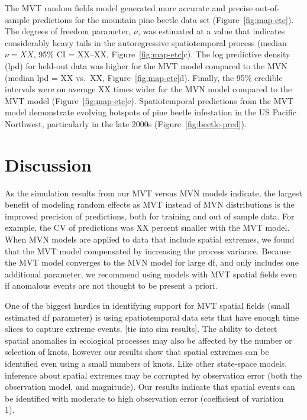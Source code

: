 \documentclass[12pt,english]{article}
\begin{document}
\begin{spacing}{1.3}
The MVT random fields model generated more accurate and precise out-of-sample
predictions for the mountain pine beetle data set (Figure~\ref{fig:map-etc}).
The degrees of freedom parameter, $\nu$, was estimated at a value that
indicates considerably heavy tails in the autoregressive spatiotemporal process
(median $\nu = XX$, 95\% CI = XX--XX, Figure~\ref{fig:map-etc}c). The log
predictive density (lpd) for held-out data was higher for the MVT model
compared to the MVN (median lpd = XX vs.\ XX, Figure~\ref{fig:map-etc}d).
Finally, the 95\% credible intervals were on average XX times wider for the MVN
model compared to the MVT model (Figure~\ref{fig:map-etc}e). Spatiotemporal
predictions from the MVT model demonstrate evolving hotspots of pine beetle
infestation in the US Pacific Northwest, particularly in the late 2000s
(Figure~\ref{fig:beetle-pred}).

\section{Discussion}

As the simulation results from our MVT versus MVN models indicate, the largest
benefit of modeling random effects as MVT instead of MVN distributions is the
improved precision of predictions, both for training and out of sample data.
For example, the CV of predictions was XX percent smaller with the MVT model.
When MVN models are applied to data that include spatial extremes, we found that
the MVT model compensated by increasing the process variance. Because the MVT model
converges to the MVN model for large df, and only includes one additional parameter,
we recommend using models with MVT spatial fields even if anomalous events are not
thought to be present a priori.

One of the biggest hurdles in identifying support for MVT spatial fields (small estimated
df parameter) is using spatiotemporal data sets that have enough time slices to capture
extreme events. [tie into sim results]. The ability to detect spatial anomalies in ecological
processes may also be affected by the number or selection of knots, however our results
show that spatial extremes can be identified even using a small numbers of knots. Like other
state-space models, inference about spatial extremes may be corrupted by observation
error (both the observation model, and magnitude). Our results indicate that spatial events
can be identified with moderate to high observation error (coefficient of variation ~ 1).


\end{spacing}
\end{document}

